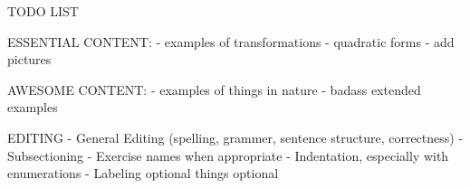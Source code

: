 TODO LIST

ESSENTIAL CONTENT:
  - examples of transformations
  - quadratic forms
  - add pictures

AWESOME CONTENT:
  - examples of things in nature
  - badass extended examples

EDITING
  - General Editing (spelling, grammer, sentence structure, correctness)
  - Subsectioning
  - Exercise names when appropriate
  - Indentation, especially with enumerations
  - Labeling optional things optional